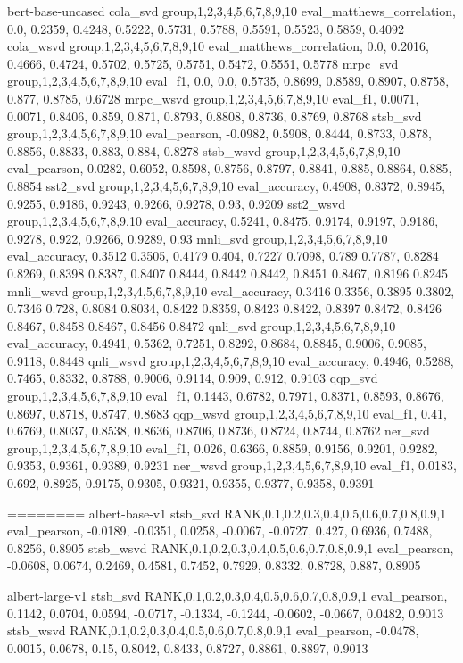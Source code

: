 bert-base-uncased
cola_svd
group,1,2,3,4,5,6,7,8,9,10
eval_matthews_correlation, 0.0, 0.2359, 0.4248, 0.5222, 0.5731, 0.5788, 0.5591, 0.5523, 0.5859, 0.4092
cola_wsvd
group,1,2,3,4,5,6,7,8,9,10
eval_matthews_correlation, 0.0, 0.2016, 0.4666, 0.4724, 0.5702, 0.5725, 0.5751, 0.5472, 0.5551, 0.5778
mrpc_svd
group,1,2,3,4,5,6,7,8,9,10
eval_f1, 0.0, 0.0, 0.5735, 0.8699, 0.8589, 0.8907, 0.8758, 0.877, 0.8785, 0.6728
mrpc_wsvd
group,1,2,3,4,5,6,7,8,9,10
eval_f1, 0.0071, 0.0071, 0.8406, 0.859, 0.871, 0.8793, 0.8808, 0.8736, 0.8769, 0.8768
stsb_svd
group,1,2,3,4,5,6,7,8,9,10
eval_pearson, -0.0982, 0.5908, 0.8444, 0.8733, 0.878, 0.8856, 0.8833, 0.883, 0.884, 0.8278
stsb_wsvd
group,1,2,3,4,5,6,7,8,9,10
eval_pearson, 0.0282, 0.6052, 0.8598, 0.8756, 0.8797, 0.8841, 0.885, 0.8864, 0.885, 0.8854
sst2_svd
group,1,2,3,4,5,6,7,8,9,10
eval_accuracy, 0.4908, 0.8372, 0.8945, 0.9255, 0.9186, 0.9243, 0.9266, 0.9278, 0.93, 0.9209
sst2_wsvd
group,1,2,3,4,5,6,7,8,9,10
eval_accuracy, 0.5241, 0.8475, 0.9174, 0.9197, 0.9186, 0.9278, 0.922, 0.9266, 0.9289, 0.93
mnli_svd
group,1,2,3,4,5,6,7,8,9,10
eval_accuracy, 0.3512 0.3505, 0.4179 0.404, 0.7227 0.7098, 0.789 0.7787, 0.8284 0.8269, 0.8398 0.8387, 0.8407 0.8444, 0.8442 0.8442, 0.8451 0.8467, 0.8196 0.8245
mnli_wsvd
group,1,2,3,4,5,6,7,8,9,10
eval_accuracy, 0.3416 0.3356, 0.3895 0.3802, 0.7346 0.728, 0.8084 0.8034, 0.8422 0.8359, 0.8423 0.8422, 0.8397 0.8472, 0.8426 0.8467, 0.8458 0.8467, 0.8456 0.8472
qnli_svd
group,1,2,3,4,5,6,7,8,9,10
eval_accuracy, 0.4941, 0.5362, 0.7251, 0.8292, 0.8684, 0.8845, 0.9006, 0.9085, 0.9118, 0.8448
qnli_wsvd
group,1,2,3,4,5,6,7,8,9,10
eval_accuracy, 0.4946, 0.5288, 0.7465, 0.8332, 0.8788, 0.9006, 0.9114, 0.909, 0.912, 0.9103
qqp_svd
group,1,2,3,4,5,6,7,8,9,10
eval_f1, 0.1443, 0.6782, 0.7971, 0.8371, 0.8593, 0.8676, 0.8697, 0.8718, 0.8747, 0.8683
qqp_wsvd
group,1,2,3,4,5,6,7,8,9,10
eval_f1, 0.41, 0.6769, 0.8037, 0.8538, 0.8636, 0.8706, 0.8736, 0.8724, 0.8744, 0.8762
ner_svd
group,1,2,3,4,5,6,7,8,9,10
eval_f1, 0.026, 0.6366, 0.8859, 0.9156, 0.9201, 0.9282, 0.9353, 0.9361, 0.9389, 0.9231
ner_wsvd
group,1,2,3,4,5,6,7,8,9,10
eval_f1, 0.0183, 0.692, 0.8925, 0.9175, 0.9305, 0.9321, 0.9355, 0.9377, 0.9358, 0.9391

========
albert-base-v1
stsb_svd
RANK,0.1,0.2,0.3,0.4,0.5,0.6,0.7,0.8,0.9,1
eval_pearson, -0.0189, -0.0351, 0.0258, -0.0067, -0.0727, 0.427, 0.6936, 0.7488, 0.8256, 0.8905
stsb_wsvd
RANK,0.1,0.2,0.3,0.4,0.5,0.6,0.7,0.8,0.9,1
eval_pearson, -0.0608, 0.0674, 0.2469, 0.4581, 0.7452, 0.7929, 0.8332, 0.8728, 0.887, 0.8905

albert-large-v1
stsb_svd
RANK,0.1,0.2,0.3,0.4,0.5,0.6,0.7,0.8,0.9,1
eval_pearson, 0.1142, 0.0704, 0.0594, -0.0717, -0.1334, -0.1244, -0.0602, -0.0667, 0.0482, 0.9013
stsb_wsvd
RANK,0.1,0.2,0.3,0.4,0.5,0.6,0.7,0.8,0.9,1
eval_pearson, -0.0478, 0.0015, 0.0678, 0.15, 0.8042, 0.8433, 0.8727, 0.8861, 0.8897, 0.9013



